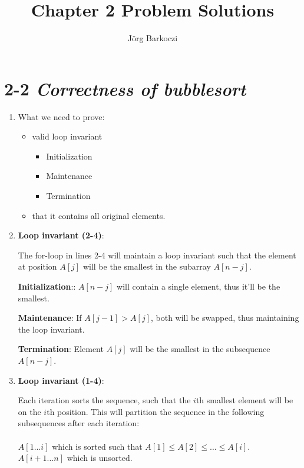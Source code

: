 \documentclass[11pt, letterpaper]{article}
\author{Jörg Barkoczi}
\title{\vspace{-2.0cm}Chapter 2 Problem Solutions}
\date{ }
\begin{document}
\maketitle
\section*{2-2 \textit{Correctness of bubblesort}}
\begin{enumerate}[label=\alph*)]
    \item
        What we need to prove:
        \begin{itemize}
            \item
                valid loop invariant
                \begin{itemize}
                    \item Initialization
                    \item Maintenance
                    \item Termination
                \end{itemize}
            \item
                that it contains all original elements.
        \end{itemize}
    \item
        \textbf{Loop invariant (2-4)}:

        The for-loop in lines 2-4 will maintain a loop invariant
        such that the element at position $A[j]$ will be the smallest
        in the subarray $A[n-j]$.

        \textbf{Initialization}:: $A[n-j]$ will contain a single element, thus it'll be the smallest.

        \textbf{Maintenance}: If $A[j-1] > A[j]$, both will be swapped, thus maintaining the
        loop invariant.
       
        \textbf{Termination}: Element $A[j]$ will be the smallest in the subsequence $A[n-j]$.

   \item
       \textbf{Loop invariant (1-4)}:

        Each iteration sorts the sequence, such that the $i$th smallest element will 
        be on the $i$th position. This will partition the sequence in the following 
        subsequences after each iteration:\\~\\
        $A[1...i]$ which is sorted such that $A[1] \leq A[2] \leq \dots \leq A[i]$.\\
        $A[i+1 \dots n]$ which is unsorted.


\end{enumerate}
\end{document}
